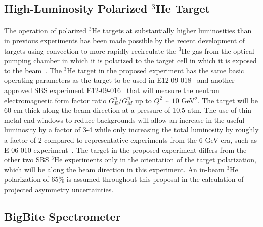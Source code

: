 \subsection{High-Luminosity Polarized $^3$He Target}
\paragraph{}
The operation of polarized $^3$He targets at substantially higher luminosities than in previous experiments has been made possible by the recent development of targets using convection to more rapidly recirculate the $^3$He gas from the optical pumping chamber in which it is polarized to the target cell in which it is exposed to the beam~\cite{Helium3_target}. The $^3$He target in the proposed experiment has the same basic operating parameters as the target to be used in E12-09-018~\cite{SBS_SIDIS} and another approved SBS experiment E12-09-016~\cite{GEN2} that will measure the neutron electromagnetic form factor ratio $G_E^n/G_M^n$ up to $Q^2 \sim 10$ GeV$^2$. The target will be 60 cm thick along the beam direction at a pressure of 10.5 atm. The use of thin metal end windows to reduce backgrounds will allow an increase in the useful luminosity by a factor of 3-4 while only increasing the total luminosity by roughly a factor of 2 compared to representative experiments from the 6 GeV era, such as E-06-010 experiment~\cite{E06010_AUT_PRL}. The target in the proposed experiment differs from the other two SBS $^3$He experiments only in the orientation of the target polarization, which will be along the beam direction in this experiment. An in-beam $^3$He  polarization of 65\% is assumed throughout this proposal in the calculation of projected asymmetry uncertainties. 
\subsection{BigBite Spectrometer}
